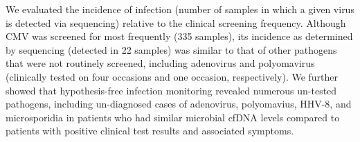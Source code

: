 We evaluated the incidence of infection (number of samples in which a given virus is detected via sequencing) relative to the clinical screening frequency. Although CMV was screened for most frequently (335 samples), its incidence as determined by sequencing (detected in 22 samples) was similar to that of other pathogens that were not routinely screened, including adenovirus and polyomavirus (clinically tested on four occasions and one occasion, respectively). We further showed that hypothesis-free infection monitoring revealed numerous un-tested pathogens, including un-diagnosed cases of adenovirus, polyomavius, HHV-8, and microsporidia in patients who had similar microbial cfDNA levels compared to patients with positive clinical test results and associated symptoms. 
